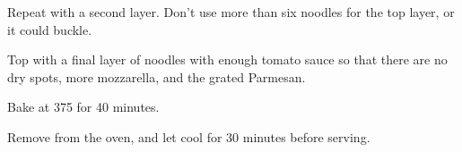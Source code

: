 \begin{recipe}
Repeat with a second layer. Don't use more than six noodles for the top layer, or it could buckle. 


Top with a final layer of noodles with enough tomato sauce so that there are no dry spots, more mozzarella, and the grated Parmesan.

Bake at 375\degree{} for 40 minutes.

Remove from the oven, and let cool for 30 minutes before serving.

\end{recipe}
